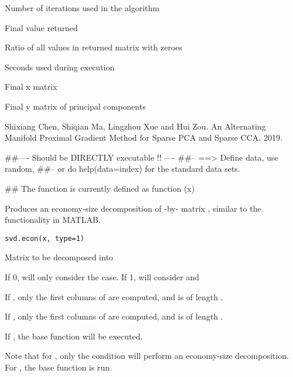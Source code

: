 \documentclass[a4paper]{book}
\begin{document}
%
\begin{Value}
\begin{ldescription}
\item[\code{iter}] Number of iterations used in the algorithm
\item[\code{f\_amanpg}] Final value returned
\item[\code{sparsity}] Ratio of all values in returned matrix with zeroes
\item[\code{time}] Seconds used during execution
\item[\code{x}] Final x matrix
\item[\code{y\_man}] Final y matrix of principal components
\end{ldescription}
\end{Value}
%
\begin{References}\relax
Shixiang Chen, Shiqian Ma, Lingzhou Xue and Hui Zou. An Alternating Manifold Proximal Gradient Method for Sparse PCA and Sparse CCA. 2019.
\end{References}
%
\begin{Examples}
\begin{ExampleCode}
##---- Should be DIRECTLY executable !! ----
##-- ==>  Define data, use random,
##--	or do  help(data=index)  for the standard data sets.

## The function is currently defined as
function (x)
{
  }
\end{ExampleCode}
\end{Examples}
%
\begin{Description}\relax
Produces an economy-size decomposition of -by- matrix , similar to the functionality in MATLAB.
\end{Description}
%
\begin{Usage}
\begin{verbatim}
svd.econ(x, type=1)
\end{verbatim}
\end{Usage}
%
\begin{Arguments}
\begin{ldescription}
\item[\code{x}] Matrix to be decomposed into 
\item[\code{type}] If 0, will only consider the  case. If 1, will consider  and 
\end{ldescription}
\end{Arguments}
%
\begin{Details}\relax
If , only the first  columns of  are computed, and  is of length .

If , only the first  columns of  are computed, and  is of length .

If , the base  function will be executed.

Note that for , only the condition  will perform an economy-size decomposition. For , the base  function is run.
\end{Details}
\end{document}
